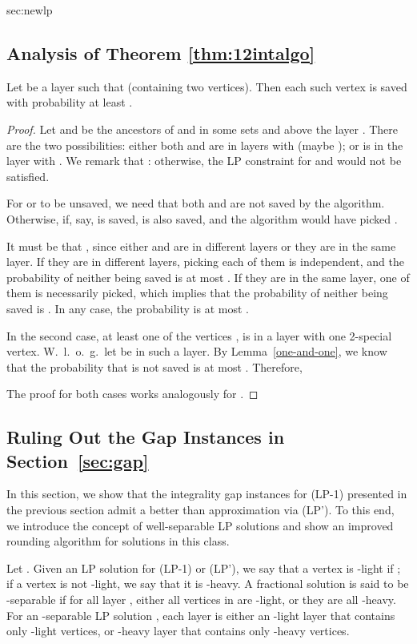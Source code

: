 \begin{appendixextra}{sec:newlp}{\subsection{Analysis of Theorem \ref{thm:12intalgo}}}
\begin{lemma}
Let  be a layer such that  (containing two vertices). Then each such vertex is saved with probability at least . 
\end{lemma}

\begin{proof}

Let  and  be the ancestors of  and  in some sets  and  above the layer .
There are the two possibilities: either both  and  are in layers with  (maybe ); or  is in the layer with . We remark that : otherwise, the LP constraint for  and  would not be satisfied.

For  or  to be unsaved, we need that both  and  are not saved by the algorithm.  
Otherwise, if, say,  is saved,  is also saved, and the algorithm would have picked .



It must be that ,
since either  and  are in different layers or they are in the same
layer. 
If they are in different layers, picking each of them is independent,
and the probability of neither being saved is at most . 
If they are in
the same layer, one of them is necessarily picked, which implies that the
probability of neither being saved is . In any case, the probability is at most .

In the second case, at least one of the vertices ,  is in a layer with one
2-special vertex. W.~l.~o.~g.~let  be in such a
layer. By Lemma~\ref{one-and-one}, we know that the probability that 
is not saved is at most . 
Therefore, 



The proof for both cases works analogously for .
\end{proof}

\end{appendixextra}

\subsection{Ruling Out the Gap Instances in Section~\ref{sec:gap}}  
\label{sec:well-separable}

In this section, we show that the integrality gap instances for (LP-1) presented in the previous section admit a better than  approximation via (LP').
To this end, we introduce the concept of well-separable LP solutions  and show an improved rounding algorithm for solutions in this class.  


Let . 
Given an LP solution  for (LP-1) or (LP'), we say that a vertex  is -light if ; if a vertex  is not -light, we say that it is -heavy. 
A fractional solution is said to be -separable if for all layer , either all vertices in  are -light, or they are all -heavy.  
For an -separable LP solution , each layer  is either an -light layer that contains only -light vertices, or -heavy layer that contains only -heavy vertices.

